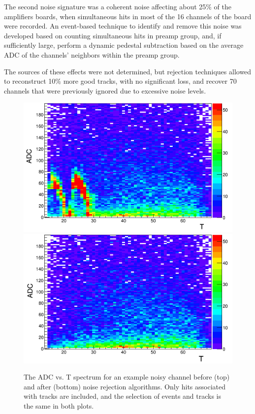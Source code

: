 \documentclass[preprint,5p]{elsarticle}
\begin{document}
The second noise signature was a coherent noise affecting about 25\% of the 
amplifiers boards, when simultaneous hits in most of the 16 channels of the
board were recorded. An event-based technique to identify and remove this noise was developed based 
on counting simultaneous hits in preamp group, and, if sufficiently large, 
perform a dynamic pedestal subtraction based on the average ADC of the 
channels' neighbors within the preamp group.

The sources of these effects were not determined, but rejection techniques 
allowed to reconstruct 10\% more good tracks, with no significant loss, and 
recover 70 channels that were previously ignored due to excessive noise levels.

\begin{figure}[tb!]\centering
\includegraphics[scale=0.25]{fig/noisy_pad_before_rejection2.png}
\includegraphics[scale=0.25]{fig/noisy_pad_after_rejection2.png}
\caption{The ADC vs. T spectrum for an example noisy channel before (top) and 
after (bottom) noise rejection algorithms.  Only hits associated with tracks 
are included, and the selection of events and tracks is the same in both 
plots.}
\label{fig:noise}
\end{figure}
\end{document}
